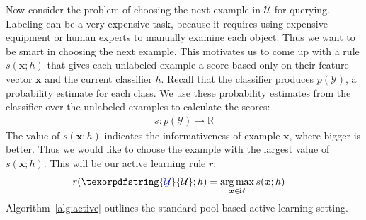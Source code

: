 \documentclass[fleqn,10pt,lineno]{wlpeerj} %
\newcommand{\Y}{\mathcal{Y}}
\newcommand{\Unlabeled}{\mathcal{U}}
\newcommand*{\argmax}{\operatornamewithlimits{arg\,max}\limits}
\providecommand{\DIFaddtex}[1]{{\protect\color{blue}\uwave{#1}}} %
\providecommand{\DIFdeltex}[1]{{\protect\color{red}\sout{#1}}}                      %
\providecommand{\DIFaddbegin}{} %
\providecommand{\DIFaddend}{} %
\providecommand{\DIFdelbegin}{} %
\providecommand{\DIFdelend}{} %
\providecommand{\DIFadd}[1]{\texorpdfstring{\DIFaddtex{#1}}{#1}} %
\providecommand{\DIFdel}[1]{\texorpdfstring{\DIFdeltex{#1}}{}} %
\begin{document}
Now consider the problem of choosing the next example in $\Unlabeled$ for
querying. Labeling can be a very expensive task, because it requires using
expensive equipment or human experts to manually examine each object. Thus we
want to be smart in choosing the next example. This motivates us to come up
with a rule $s(\bm{x}; h)$ that gives each unlabeled example a score based only
on their feature vector $\bm{x}$ and the current classifier $h$. Recall that
the classifier produces $p(\Y)$, a probability estimate for each class. We use
these probability estimates from the classifier over the unlabeled examples to
calculate the scores:
\begin{align}
	s : p(\Y) \rightarrow \mathbb{R}
\end{align}
The value of $s(\bm{x}; h)$ indicates the informativeness of example $\bm{x}$,
where bigger is better. \DIFdelbegin \DIFdel{Thus we would like to choose }\DIFdelend \DIFaddbegin \DIFadd{We would then label }\DIFaddend the example with the largest value
of $s(\bm{x}; h)$. This will be our active learning rule $r$:
\begin{align}
	r(\DIFdelbegin %
\DIFdelend \DIFaddbegin \DIFadd{\Unlabeled}\DIFaddend ; h) &= \argmax_{\bm{x} \in \Unlabeled} s(\bm{x}; h)
\end{align}
Algorithm~\ref{alg:active} outlines the standard pool-based active learning
setting.
\end{document}
